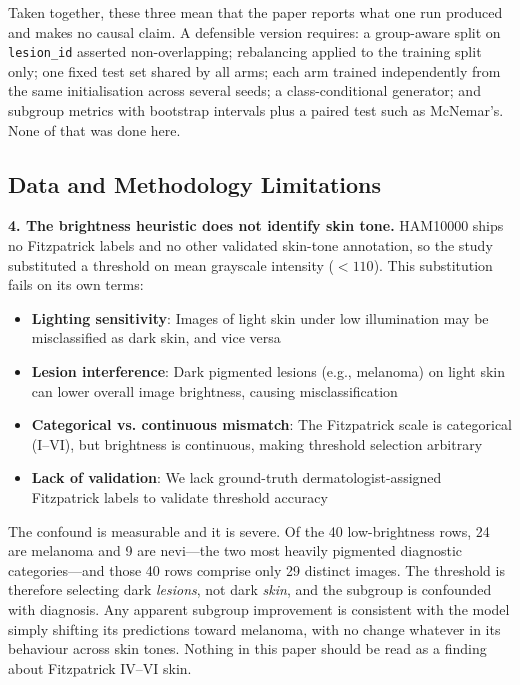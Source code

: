\documentclass[ai,article,submit,pdftex,moreauthors]{Definitions/mdpi}
\begin{document}
Taken together, these three mean that the paper reports what one run produced and makes no causal claim. A defensible version requires: a group-aware split on \texttt{lesion\_id} asserted non-overlapping; rebalancing applied to the training split only; one fixed test set shared by all arms; each arm trained independently from the same initialisation across several seeds; a class-conditional generator; and subgroup metrics with bootstrap intervals plus a paired test such as McNemar's. None of that was done here.

\subsection{Data and Methodology Limitations}

\textbf{4. The brightness heuristic does not identify skin tone.} HAM10000 ships no Fitzpatrick labels and no other validated skin-tone annotation, so the study substituted a threshold on mean grayscale intensity ($< 110$). This substitution fails on its own terms:
\begin{itemize}[leftmargin=*, itemsep=2pt]
    \item \textbf{Lighting sensitivity}: Images of light skin under low illumination may be misclassified as dark skin, and vice versa
    \item \textbf{Lesion interference}: Dark pigmented lesions (e.g., melanoma) on light skin can lower overall image brightness, causing misclassification
    \item \textbf{Categorical vs. continuous mismatch}: The Fitzpatrick scale is categorical (I--VI), but brightness is continuous, making threshold selection arbitrary
    \item \textbf{Lack of validation}: We lack ground-truth dermatologist-assigned Fitzpatrick labels to validate threshold accuracy
\end{itemize}

The confound is measurable and it is severe. Of the 40 low-brightness rows, 24 are melanoma and 9 are nevi---the two most heavily pigmented diagnostic categories---and those 40 rows comprise only 29 distinct images. The threshold is therefore selecting dark \textit{lesions}, not dark \textit{skin}, and the subgroup is confounded with diagnosis. Any apparent subgroup improvement is consistent with the model simply shifting its predictions toward melanoma, with no change whatever in its behaviour across skin tones. Nothing in this paper should be read as a finding about Fitzpatrick IV--VI skin.
\end{document}
